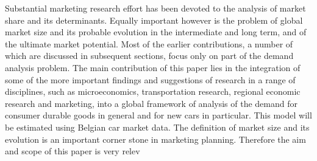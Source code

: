 Substantial marketing research effort has been devoted to the analysis of market share and its determinants. Equally important however is the problem of global market size and its probable evolution in the intermediate and long term, and of the ultimate market potential. Most of the earlier contributions, a number of which are discussed in subsequent sections, focus only on part of the demand analysis problem. The main contribution of this paper lies in the integration of some of the more important findings and suggestions of research in a range of disciplines, such as microeconomics, transportation research, regional economic research and marketing, into a global framework of analysis of the demand for consumer durable goods in general and for new cars in particular. This model will be estimated using Belgian car market data. The definition of market size and its evolution is an important corner stone in marketing planning. Therefore the aim and scope of this paper is very relev
